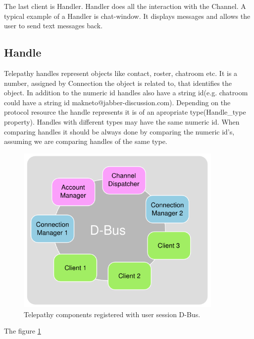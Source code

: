 The last client is Handler. Handler does all the interaction with the Channel. A typical example of a Handler is chat-window. It displays messages and allows the user to send text messages back.\cite{tpWikiClient}  

\subsection*{Handle}
Telepathy handles represent objects like contact, roster, chatroom etc. It is a number, assigned by Connection the object is related to, that identifies the object. In addition to the numeric id handles also have a string id(e.g. chatroom could have a string id makneto@jabber-discussion.com). Depending on the protocol resource the handle represents it is of an apropriate type(Handle\_type property). Handles with different types may have the same numeric id. When comparing handles it should be always done by comparing the numeric id's, assuming we are comparing handles of the same type.\cite{tpWikiHandle} 


\begin{figure}[ht]
	\begin{center}
	\includegraphics[width=10cm]{fig/telepathy-components-dbus.png}
	\caption{Telepathy components registered with user session D-Bus.\cite{tpWikiClient}}
	\label{fig:telepathyComponentsDbus}
\end{center}
\end{figure}

The figure \ref{fig:telepathyComponentsDbus}


